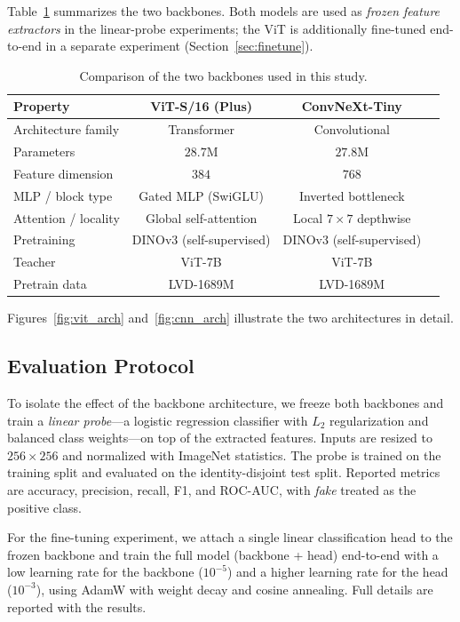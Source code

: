 \documentclass[11pt,a4paper]{article}
\begin{document}
Table~\ref{tab:backbones} summarizes the two backbones. Both models are used as \emph{frozen
feature extractors} in the linear-probe experiments; the ViT is additionally fine-tuned
end-to-end in a separate experiment (Section~\ref{sec:finetune}).

\begin{table}[H]
\centering
\caption{Comparison of the two backbones used in this study.}
\label{tab:backbones}
\begin{tabular}{lccc}
\toprule
\textbf{Property} & \textbf{ViT-S/16 (Plus)} & \textbf{ConvNeXt-Tiny} \\
\midrule
Architecture family & Transformer & Convolutional \\
Parameters & $28.7$M & $27.8$M \\
Feature dimension & $384$ & $768$ \\
MLP / block type & Gated MLP (SwiGLU) & Inverted bottleneck \\
Attention / locality & Global self-attention & Local $7\times7$ depthwise \\
Pretraining & DINOv3 (self-supervised) & DINOv3 (self-supervised) \\
Teacher & ViT-7B & ViT-7B \\
Pretrain data & LVD-1689M & LVD-1689M \\
\bottomrule
\end{tabular}
\end{table}

Figures~\ref{fig:vit_arch} and~\ref{fig:cnn_arch} illustrate the two architectures in detail.





\subsection{Evaluation Protocol}
To isolate the effect of the backbone architecture, we freeze both backbones and train a
\emph{linear probe}---a logistic regression classifier with $L_2$ regularization and balanced
class weights---on top of the extracted features. Inputs are resized to $256\times256$ and
normalized with ImageNet statistics. The probe is trained on the training split and evaluated on
the identity-disjoint test split. Reported metrics are accuracy, precision, recall, F1, and
ROC-AUC, with \emph{fake} treated as the positive class.

For the fine-tuning experiment, we attach a single linear classification head to the frozen
backbone and train the full model (backbone + head) end-to-end with a low learning rate for the
backbone ($10^{-5}$) and a higher learning rate for the head ($10^{-3}$), using AdamW with
weight decay and cosine annealing. Full details are reported with the results.
\end{document}
